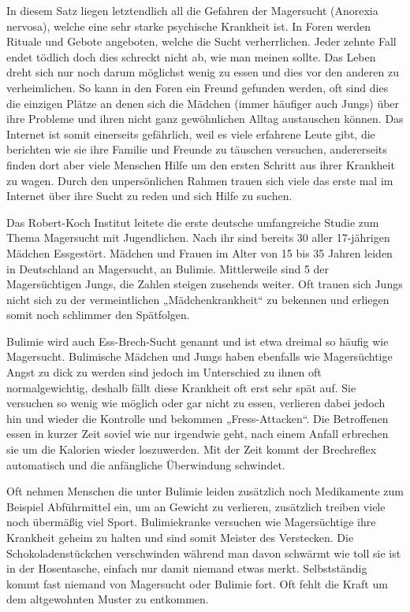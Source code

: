 In diesem Satz liegen letztendlich all die Gefahren der Magersucht (Anorexia nervosa), welche eine
sehr starke psychische Krankheit ist. In Foren werden Rituale und Gebote angeboten, welche die Sucht
verherrlichen. Jeder zehnte Fall endet tödlich doch dies schreckt nicht ab, wie man meinen sollte.
Das Leben dreht sich nur noch darum möglichst wenig zu essen und dies vor den anderen zu
verheimlichen. So kann in den Foren ein Freund gefunden werden, oft sind dies die einzigen Plätze an
denen sich die Mädchen (immer häufiger auch Jungs) über ihre Probleme und ihren
nicht ganz gewöhnlichen Alltag austauschen können. Das Internet ist somit einerseits gefährlich,
weil es viele erfahrene Leute gibt, die berichten wie sie ihre Familie und Freunde zu
täuschen versuchen, andererseits finden
dort aber viele Menschen Hilfe um den ersten Schritt aus ihrer Krankheit zu wagen. Durch den
unpersönlichen Rahmen trauen sich viele das erste mal im Internet über ihre Sucht zu reden und sich
Hilfe zu suchen.

Das Robert-Koch Institut leitete die erste deutsche umfangreiche Studie zum Thema Magersucht mit
 Jugendlichen. Nach ihr sind bereits 30\Prozent{} aller 17-jährigen Mädchen
Essgestört.  Mädchen und Frauen im Alter von 15 bis 35 Jahren leiden in Deutschland
an Magersucht,  an Bulimie. Mittlerweile sind 5\Prozent{} der Magersüchtigen Jungs,
die Zahlen steigen zusehends weiter. Oft trauen sich Jungs nicht sich zu der vermeintlichen
„Mädchenkrankheit“ zu bekennen und erliegen somit noch schlimmer den Spätfolgen.

Bulimie wird auch Ess-Brech-Sucht genannt und ist etwa dreimal so häufig wie Magersucht. Bulimische
Mädchen und Jungs haben ebenfalls wie Magersüchtige Angst zu dick zu werden sind jedoch im
Unterschied zu ihnen oft normalgewichtig, deshalb fällt diese Krankheit oft erst sehr spät auf. Sie
versuchen so wenig wie möglich oder gar nicht zu essen, verlieren dabei jedoch hin und wieder die
Kontrolle und bekommen „Fress-Attacken“. Die Betroffenen essen in kurzer Zeit soviel wie nur
irgendwie geht, nach einem Anfall erbrechen sie um die Kalorien wieder loszuwerden. Mit der Zeit
kommt der Brechreflex automatisch und die anfängliche Überwindung schwindet.

Oft nehmen Menschen die unter Bulimie leiden zusätzlich noch Medikamente zum Beispiel Abführmittel
ein, um an Gewicht zu verlieren, zusätzlich treiben viele noch übermäßig viel Sport. Bulimiekranke
versuchen wie Magersüchtige ihre Krankheit geheim zu halten und sind somit Meister des Verstecken.
Die Schokoladenstückchen verschwinden während man davon schwärmt wie toll sie ist in der Hosentasche,
einfach nur damit niemand etwas merkt. Selbstständig kommt fast niemand von Magersucht oder Bulimie
fort. Oft fehlt die Kraft um dem altgewohnten Muster zu entkommen.

